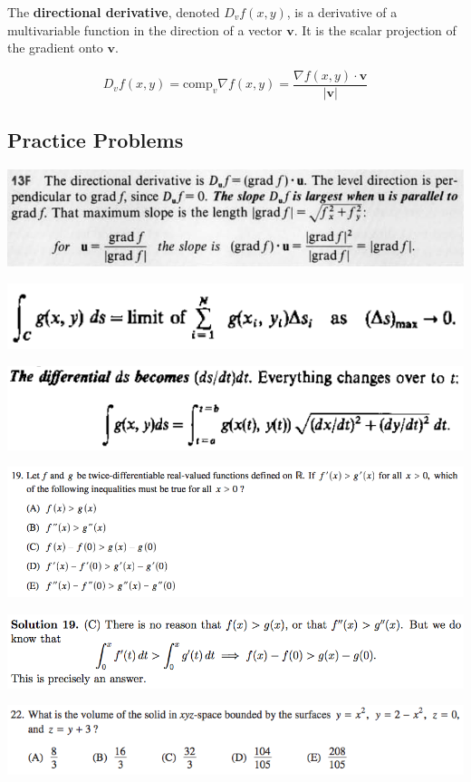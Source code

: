 \documentclass{article}
\begin{document}
The \textbf{directional derivative}, denoted \(D_v f(x, y)\), is a derivative of a multivariable function in the direction of a vector \(\boldsymbol{v}\). It is the scalar projection of the gradient onto \(\boldsymbol{v}\).

\[
D_v f(x, y) = \text{comp}_v \nabla f(x, y) = \frac{\nabla f(x, y) \cdot \boldsymbol{v}}{|\boldsymbol{v}|}
\]

\subsection{Practice Problems}

\includegraphics[scale=0.55]{gradient}

\includegraphics[scale=0.55]{line_int1}

\includegraphics[scale=0.55]{line_int2}

\includegraphics[scale=0.5]{0568_19}

\includegraphics[scale=0.5]{0568_19s}

\includegraphics[scale=0.65]{1268_22}
\end{document}
